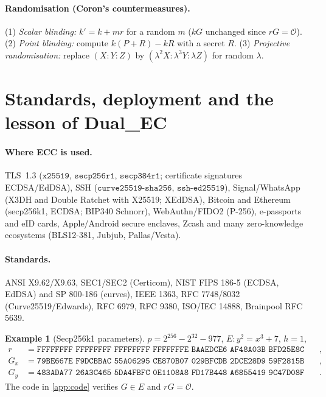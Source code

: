 \documentclass[11pt,a4paper,oneside]{book}
\theoremstyle{plain}
\theoremstyle{definition}
\newtheorem{example}[theorem]{Example}
\theoremstyle{remark}
\newcommand{\Oinf}{\mathcal{O}}
\begin{document}
\paragraph{Randomisation (Coron's countermeasures).} (1) \emph{Scalar blinding:} $k'=k+m r$ for a random $m$ ($kG$ unchanged since $rG=\Oinf$). (2) \emph{Point blinding:} compute $k(P+R)-kR$ with a secret $R$. (3) \emph{Projective randomisation:} replace $(X:Y:Z)$ by $(\lambda^2X:\lambda^3Y:\lambda Z)$ for random $\lambda$.

\section{Standards, deployment and the lesson of Dual\_EC}

\paragraph{Where ECC is used.} TLS~1.3 ($\texttt{x25519}$, $\texttt{secp256r1}$, $\texttt{secp384r1}$; certificate signatures ECDSA/EdDSA), SSH ($\texttt{curve25519-sha256}$, $\texttt{ssh-ed25519}$), Signal/WhatsApp (X3DH and Double Ratchet with X25519; XEdDSA), Bitcoin and Ethereum (secp256k1, ECDSA; BIP340 Schnorr), WebAuthn/FIDO2 (P-256), e-passports and eID cards, Apple/Android secure enclaves, Zcash and many zero-knowledge ecosystems (BLS12-381, Jubjub, Pallas/Vesta).

\paragraph{Standards.} ANSI X9.62/X9.63, SEC1/SEC2 (Certicom), NIST FIPS 186-5 (ECDSA, EdDSA) and SP 800-186 (curves), IEEE 1363, RFC 7748/8032 (Curve25519/Edwards), RFC 6979, RFC 9380, ISO/IEC 14888, Brainpool RFC 5639.

\begin{example}[Secp256k1 parameters]
$p=2^{256}-2^{32}-977$, $E:y^2=x^3+7$, $h=1$,
\begin{align*}
r&=\texttt{FFFFFFFF FFFFFFFF FFFFFFFF FFFFFFFE BAAEDCE6 AF48A03B BFD25E8C D0364141},\\
G_x&=\texttt{79BE667E F9DCBBAC 55A06295 CE870B07 029BFCDB 2DCE28D9 59F2815B 16F81798},\\
G_y&=\texttt{483ADA77 26A3C465 5DA4FBFC 0E1108A8 FD17B448 A6855419 9C47D08F FB10D4B8}.
\end{align*}
The code in \cref{app:code} verifies $G\in E$ and $rG=\Oinf$.
\end{example}
\end{document}

